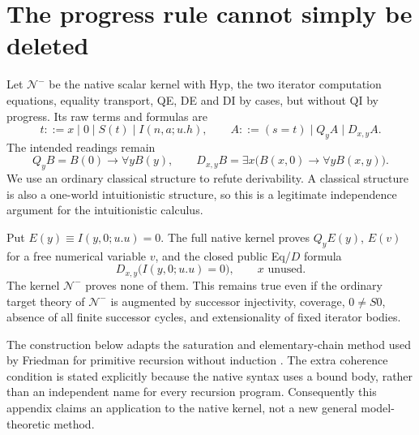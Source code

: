 
\section{The progress rule cannot simply be deleted}
\label{sec:progress-independence}

Let $\mathcal N^{-}$ be the native scalar kernel with Hyp, the two
iterator computation equations, equality transport, QE, DE and DI by
cases, but without QI by progress.  Its raw terms and formulas are
\[
 t::=x\mid0\mid S(t)\mid I(n,a;u.h),\qquad
 A::=(s=t)\mid Q_y A\mid D_{x,y}A.
\]
The intended readings remain
\[
 Q_y B=B(0)\to\forall y B(y),\qquad
 D_{x,y}B=\exists x\bigl(B(x,0)\to\forall y B(x,y)\bigr).
\]
We use an ordinary classical structure to refute derivability.  A
classical structure is also a one-world intuitionistic structure, so
this is a legitimate independence argument for the intuitionistic
calculus.

\begin{theorem}
\label{thm:progress-independent}
Put $E(y)\equiv I(y,0;u.u)=0$.  The full native kernel proves
$Q_yE(y)$, $E(v)$ for a free numerical variable $v$, and the closed
public Eq/$D$ formula
\[
                 D_{x,y}\bigl(I(y,0;u.u)=0\bigr),
                 \qquad x\text{ unused}.
\]
The kernel $\mathcal N^{-}$ proves none of them.  This remains true even if the
ordinary target theory of $\mathcal N^{-}$ is augmented by successor
injectivity, coverage, $0\ne S0$, absence of all finite successor
cycles, and extensionality of fixed iterator bodies.
\end{theorem}

The construction below adapts the saturation and elementary-chain
method used by Friedman for primitive recursion without induction
\cite[Theorem~8 and Lemmas~24--25]{friedman1975}.  The extra coherence
condition is stated explicitly because the native syntax uses a bound
body, rather than an independent name for every recursion program.
Consequently this appendix claims an application to the native kernel,
not a new general model-theoretic method.

